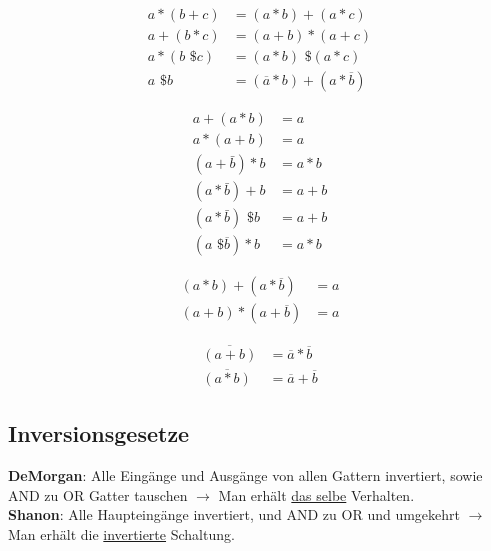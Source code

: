 \begin{minipage}{0.2\textwidth}
	\begin{align*}
		a * (b + c) &= (a * b) + (a * c) \\
		a + (b * c) &= (a + b) * (a + c) \\
		a * (b \text{ \$ } c) &= (a * b) \text{ \$ } (a * c) \\
		a \text{ \$ } b &= (\overline{a} * b) + (a * \overline{b})
	\end{align*}
\end{minipage}
\begin{minipage}{0.2\textwidth}
	\begin{align*}
		a + (a * b) &= a \\
		a * (a + b) &= a \\
		(a + \bar{b}) * b &= a * b \\
		(a * \bar{b}) + b &= a + b \\
		(a * \bar{b}) \text{ \$ } b &= a + b \\
		(a \text{ \$ } \overline{b}) * b &= a * b	
	\end{align*}
\end{minipage}

\begin{minipage}{0.2\textwidth}
	\begin{align*}
		(a * b) + (a * \overline{b}) &= a \\
		(a + b) * (a + \overline{b}) &= a
	\end{align*}
\end{minipage}
\begin{minipage}{0.2\textwidth}
	\begin{align*}
		\overline{(a + b)} &=  \overline{a} * \overline{b} \\
		\overline{(a * b)} &=  \overline{a} + \overline{b}
	\end{align*}
\end{minipage}

\subsection{Inversionsgesetze}
\noindent \textbf{DeMorgan}: Alle Eingänge und Ausgänge von allen Gattern invertiert, sowie AND zu OR Gatter tauschen $\rightarrow$ Man erhält \underline{das selbe} Verhalten. \\
\noindent \textbf{Shanon}: Alle Haupteingänge invertiert, und AND zu OR und umgekehrt $\rightarrow$ Man erhält die \underline{invertierte} Schaltung.

